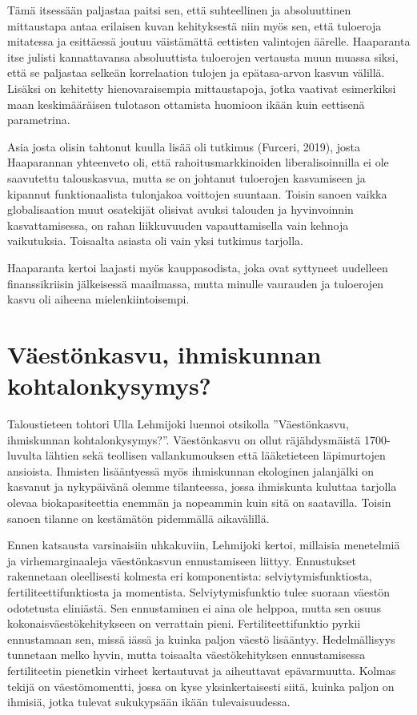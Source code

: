 \documentclass[12pt]{article}
\begin{document}
Tämä itsessään paljastaa paitsi sen, että suhteellinen ja absoluuttinen
mittaustapa antaa erilaisen kuvan kehityksestä niin myös sen, että tuloeroja
mitatessa ja esittäessä joutuu väistämättä eettisten valintojen äärelle.
Haaparanta itse julisti kannattavansa absoluuttista tuloerojen vertausta muun
muassa siksi, että se paljastaa selkeän korrelaation tulojen ja epätasa-arvon
kasvun välillä. Lisäksi on kehitetty hienovaraisempia mittaustapoja, jotka
vaativat esimerkiksi maan keskimääräisen tulotason ottamista huomioon ikään
kuin eettisenä parametrina.

Asia josta olisin tahtonut kuulla lisää oli tutkimus (Furceri, 2019), josta
Haaparannan yhteenveto oli, että rahoitusmarkkinoiden liberalisoinnilla ei ole
saavutettu talouskasvua, mutta se on johtanut tuloerojen kasvamiseen ja
kipannut funktionaalista tulonjakoa voittojen suuntaan. Toisin sanoen vaikka
globalisaation muut osatekijät olisivat avuksi talouden ja hyvinvoinnin
kasvattamisessa, on rahan liikkuvuuden vapauttamisella vain kehnoja
vaikutuksia. Toisaalta asiasta oli vain yksi tutkimus tarjolla.

Haaparanta kertoi laajasti myös kauppasodista, joka ovat syttyneet uudelleen
finanssikriisin jälkeisessä maailmassa, mutta minulle vaurauden ja tuloerojen
kasvu oli aiheena mielenkiintoisempi.


\newpage
\section{Väestönkasvu, ihmiskunnan kohtalonkysymys?}

Taloustieteen tohtori Ulla Lehmijoki luennoi otsikolla ''Väestönkasvu,
ihmiskunnan kohtalonkysymys?''. Väestönkasvu on ollut räjähdysmäistä
1700-luvulta lähtien sekä teollisen vallankumouksen että lääketieteen
läpimurtojen ansioista. Ihmisten lisääntyessä myös ihmiskunnan ekologinen
jalanjälki on kasvanut ja nykypäivänä olemme tilanteessa, jossa ihmiskunta
kuluttaa tarjolla olevaa biokapasiteettia enemmän ja nopeammin kuin sitä on
saatavilla. Toisin sanoen tilanne on kestämätön pidemmällä aikavälillä.

Ennen katsausta varsinaisiin uhkakuviin, Lehmijoki kertoi, millaisia menetelmiä
ja virhemarginaaleja väestönkasvun ennustamiseen liittyy. Ennustukset
rakennetaan oleellisesti kolmesta eri komponentista: selviytymisfunktiosta,
fertiliteettifunktiosta ja momentista. Selviytymisfunktio tulee suoraan väestön
odotetusta eliniästä. Sen ennustaminen ei aina ole helppoa, mutta sen osuus
kokonaisväestökehitykseen on verrattain pieni. Fertiliteettifunktio pyrkii
ennustamaan sen, missä iässä ja kuinka paljon väestö lisääntyy. Hedelmällisyys
tunnetaan melko hyvin, mutta toisaalta väestökehityksen ennustamisessa
fertiliteetin pienetkin virheet kertautuvat ja aiheuttavat epävarmuutta. Kolmas
tekijä on väestömomentti, jossa on kyse yksinkertaisesti siitä, kuinka paljon
on ihmisiä, jotka tulevat sukukypsään ikään tulevaisuudessa.
\end{document}

